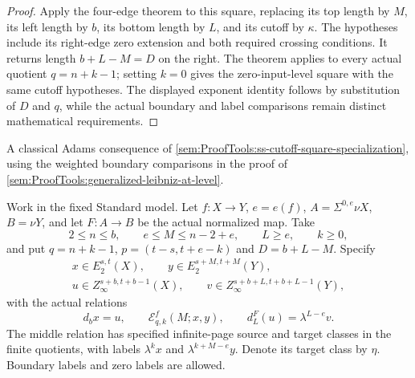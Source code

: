 \begin{proof}
Apply the four-edge theorem to this square, replacing its top length
by $M$, its left length by $b$, its bottom length by $L$, and its
cutoff by $\kappa$. The hypotheses include its right-edge zero
extension and both required crossing conditions. It returns length
$b+L-M=D$ on the right. The theorem applies to every actual quotient
$q=n+k-1$; setting $k=0$ gives the zero-input-level square with the
same cutoff hypotheses. The displayed exponent identity follows by
substitution of $D$ and $q$, while the actual boundary and label
comparisons remain distinct mathematical requirements.
\end{proof}

\begin{corollary}
\label{sem:ProofTools:ss-adams-soundness}
A classical Adams consequence of
\ref{sem:ProofTools:ss-cutoff-square-specialization}, using the
weighted boundary comparisons in the proof of
\ref{sem:ProofTools:generalized-leibniz-at-level}.

Work in the fixed Standard model. Let $f:X\to Y$, $e=e(f)$,
$A=\Sigma^{0,e}\nu X$, $B=\nu Y$, and let $F:A\to B$ be the
actual normalized map. Take
\[
2\le n\le b,\qquad e\le M\le n-2+e,\qquad L\ge e,\qquad k\ge0,
\]
and put $q=n+k-1$, $p=(t-s,t+e-k)$ and $D=b+L-M$.
Specify
\[
\begin{gathered}
x\in E_2^{s,t}(X),\qquad y\in E_2^{s+M,t+M}(Y),\\
u\in Z_\infty^{s+b,t+b-1}(X),\qquad
v\in Z_\infty^{s+b+L,t+b+L-1}(Y),
\end{gathered}
\]
with the actual relations
\[
d_bx=u,\qquad
\mathcal E^f_{q,k}(M;x,y),\qquad
d_L^F(u)=\lambda^{L-e}v.
\]
The middle relation has specified infinite-page source and target
classes in the finite quotients, with labels
$\lambda^kx$ and $\lambda^{k+M-e}y$. Denote its target class by
$\eta$. Boundary labels and zero labels are allowed.


\end{corollary}
